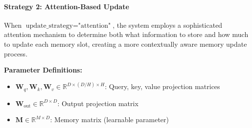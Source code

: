 \documentclass{article}
\begin{document}
\paragraph{Strategy 2: Attention-Based Update}

When $\text{update\_strategy} = \text{"attention"}$, the system employs a sophisticated attention mechanism to determine both what information to store and how much to update each memory slot, creating a more contextually aware memory update process.

\textbf{Parameter Definitions:}
\begin{itemize}
\item $\mathbf{W}_q, \mathbf{W}_k, \mathbf{W}_v \in \mathbb{R}^{D \times (D/H) \times H}$: Query, key, value projection matrices
\item $\mathbf{W}_{\text{out}} \in \mathbb{R}^{D \times D}$: Output projection matrix
\item $\mathbf{M} \in \mathbb{R}^{M \times D}$: Memory matrix (learnable parameter)
\end{itemize}
\end{document}
